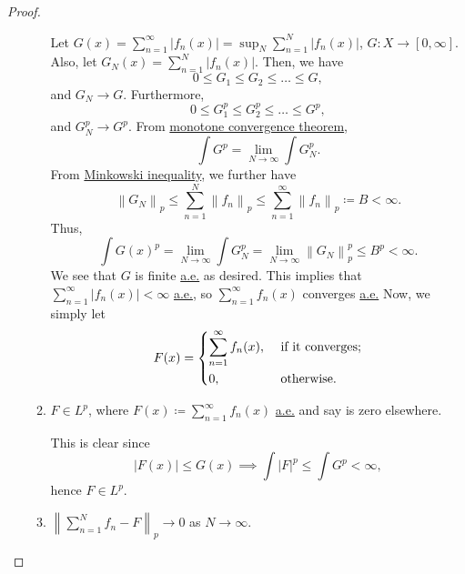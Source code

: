 \begin{proof}
\begin{enumerate}
\begin{enumerate}
			            \par  Let \(G(x) = \sum\limits_{n=1}^{\infty} \left\vert f_{n} (x) \right\vert = \sup _N \sum\limits_{n=1}^{N} \left\vert f_{n} (x) \right\vert  \), \(G\colon X\to [0, \infty ]\). Also, let
			            \(G_{N} (x)= \sum\limits_{n=1}^{N} \left\vert f_{n} (x) \right\vert \). Then, we have
			            \[
				            0\leq G_{1} \leq G_2 \leq \ldots \leq G,
			            \]
			            and \(G_{N} \to G \). Furthermore,
			            \[
				            0\leq G^p_1 \leq G^p_2 \leq \ldots \leq G^p,
			            \]
			            and \(G^p_N \to G^p\). From \hyperref[thm:MCT]{monotone convergence theorem},
			            \[
				            \int G^p = \lim\limits_{N \to \infty} \int G^p_N.
			            \]
			            From \hyperref[thm:Minkowski-inequality]{Minkowski inequality}, we further have
			            \[
				            \left\lVert G_N\right\rVert _p \leq \sum\limits_{n=1}^{N} \left\lVert f_{n} \right\rVert _p \leq \sum\limits_{n=1}^{\infty} \left\lVert f_{n} \right\rVert _p \coloneqq B < \infty.
			            \]
			            Thus,
			            \[
				            \int G(x)^p = \lim\limits_{N \to \infty} \int G^p_N = \lim\limits_{N \to \infty} \left\lVert G_{N} \right\rVert ^p_p \leq B^{p} < \infty .
			            \]
			            We see that \(G\) is finite \hyperref[def:mu-almost-everywhere]{a.e.} as desired. This implies that \(\sum\limits_{n=1}^{\infty }\left\vert f_{n} (x) \right\vert  < \infty \)
			            \hyperref[def:mu-almost-everywhere]{a.e.}, so \(\sum\limits_{n=1}^{\infty }f_{n} (x) \) converges \hyperref[def:mu-almost-everywhere]{a.e.} Now, we simply let
			            \[
				            F(x) = \begin{dcases}
					            \sum\limits_{n=1}^{\infty} f_{n} (x), & \text{ if it converges}  ; \\
					            0,                                    & \text{ otherwise}.
				            \end{dcases}
			            \]
			      \item \(F\in L^p\), where \(F(x)\coloneqq \sum\limits_{n=1}^{\infty}f_{n} (x) \) \hyperref[def:mu-almost-everywhere]{a.e.} and say is zero elsewhere.
			            \par This is clear since
			            \[
				            \left\vert F(x) \right\vert \leq G(x) \implies \int \left\vert F \right\vert ^p \leq \int G^p < \infty ,
			            \]
			            hence \(F\in L^p\).
			      \item \(\left\lVert \sum\limits_{n=1}^{N} f_{n} -F\right\rVert_p \to 0\) as \(N\to \infty \).


\end{enumerate}
\end{enumerate}
\end{proof}
